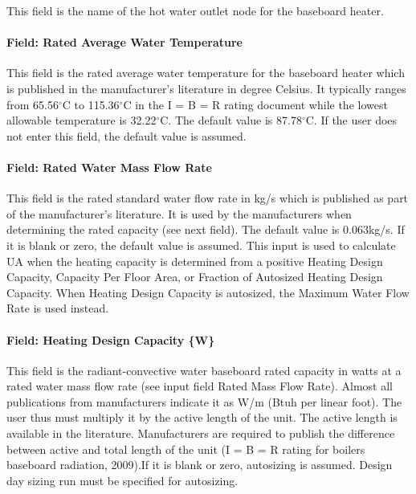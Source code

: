 This field is the name of the hot water outlet node for the baseboard heater.

\paragraph{Field: Rated Average Water Temperature}\label{field-rated-averagewatertemperature}

This field is the rated average water temperature for the baseboard heater which is published in the manufacturer's literature in degree Celsius. It typically ranges from 65.56$^\circ$C to 115.36$^\circ$C in the I = B = R rating document while the lowest allowable temperature is 32.22$^\circ$C. The default value is 87.78$^\circ$C. If the user does not enter this field, the default value is assumed.

\paragraph{Field: Rated Water Mass Flow Rate}

This field is the rated standard water flow rate in kg/s which is published as part of the manufacturer's literature. It is used by the manufacturers when determining the rated capacity (see next field). The default value is 0.063kg/s. If it is blank or zero, the default value is assumed. This input is used to calculate UA when the heating capacity is determined from a positive Heating Design Capacity, Capacity Per Floor Area, or Fraction of Autosized Heating Design Capacity. When Heating Design Capacity is autosized, the Maximum Water Flow Rate is used instead.

\paragraph{Field: Heating Design Capacity \{W\}}\label{field-heating-design-capacity-w-000}

This field is the radiant-convective water baseboard rated capacity in watts at a rated water mass flow rate (see input field Rated Mass Flow Rate). Almost all publications from manufacturers indicate it as W/m (Btuh per linear foot). The user thus must multiply it by the active length of the unit. The active length is available in the literature. Manufacturers are required to publish the difference between active and total length of the unit (I = B = R rating for boilers baseboard radiation, 2009).If it is blank or zero, autosizing is assumed. Design day sizing run must be specified for autosizing.

